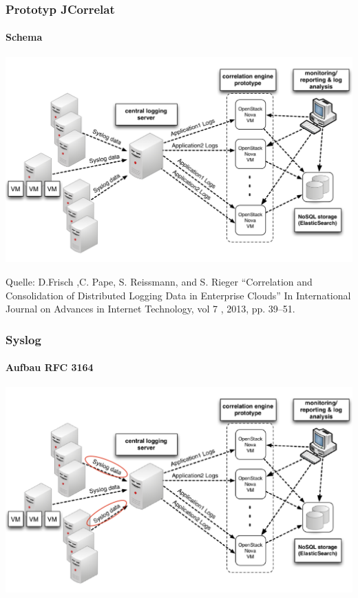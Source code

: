 \begin{frame}
\frametitle{Prototyp JCorrelat}
\framesubtitle{Schema}


 \includegraphics[scale=0.25]{img/schema_correlat-00.png}
\vspace{0.5cm}

\footnoterule
\footnotesize{
    Quelle:
    D.Frisch ,C. Pape, S. Reissmann, and S. Rieger “Correlation and
    Consolidation of Distributed Logging Data in Enterprise Clouds” In International
    Journal on Advances in Internet Technology, vol 7 , 2013, pp. 39–51.}

\end{frame}

\begin{frame}
\frametitle{Syslog}
\framesubtitle{Aufbau RFC 3164}
\includegraphics[scale=0.25]{img/schema-correlat-01.png}
\end{frame}



